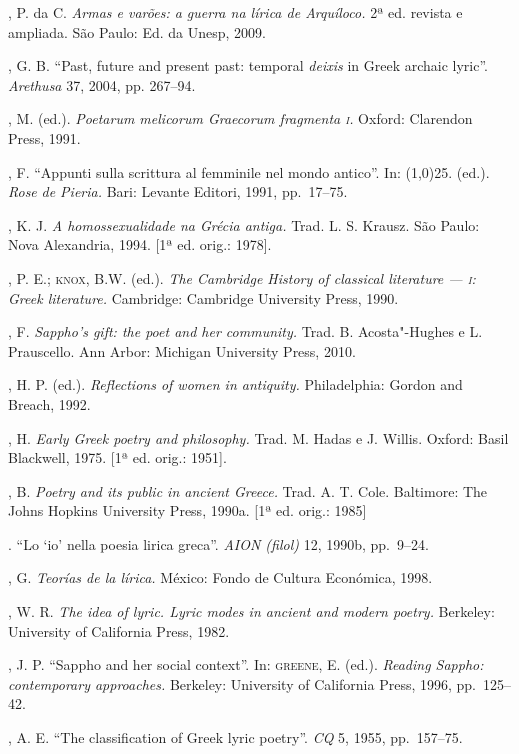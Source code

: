 \begin{bibliohedra}
, P. da C. \textit{Armas e varões: a guerra na
lírica de Arquíloco.} 2ª ed. revista e ampliada. São Paulo: Ed. da Unesp, 2009.

, G. B. “Past, future and present past: temporal
\textit{deixis} in Greek archaic lyric”. \textit{Arethusa} 37, 2004, pp.
267--94.

, M. (ed.). \textit{Poetarum melicorum Graecorum fragmenta \textsc{i}.}
Oxford: Clarendon Press, 1991.

, F. “Appunti sulla scrittura al femminile nel mondo antico''.
In: \line(1,0){25}. (ed.). \textit{Rose} \textit{de Pieria.} Bari: Levante Editori,
1991, pp.~17--75.

, K. J.  \textit{A homossexualidade na Grécia antiga.}
Trad. L. S. Krausz. São Paulo: Nova Alexandria, 1994. [1ª ed. orig.: 1978].

, P. E.; \textsc{knox}, B.W. (ed.). \textit{The Cambridge History of
classical literature --- \textsc{i}: Greek literature.} Cambridge: Cambridge University
Press, 1990.

, F. \textit{Sappho’s gift: the poet and her community.} Trad.
B. Acosta"-Hughes e L. Prauscello. Ann Arbor: Michigan University Press, 2010.

, H. P. (ed.). \textit{Reflections of women in antiquity.}
Philadelphia: Gordon and Breach, 1992.

, H. \textit{Early Greek poetry and philosophy.} Trad. M. Hadas
e J. Willis. Oxford: Basil Blackwell, 1975. [1ª ed. orig.: 1951]. 

, B. \textit{Poetry and its public in ancient Greece.} Trad. A.
T. Cole. Baltimore: The Johns Hopkins University Press, 1990a.
[1ª ed. orig.: 1985]

\titidem. “Lo ‘io’ nella poesia lirica greca”. \textit{AION (filol)} 12,
1990b, pp.~9--24.

, G. \textit{Teorías de la lírica.} México: Fondo de
Cultura Económica, 1998.

, W. R. \textit{The idea of lyric. Lyric modes in ancient and
modern poetry.} Berkeley: University of California Press, 1982.

, J. P. “Sappho and her social context”. In: \textsc{greene}, E.
(ed.). \textit{Reading Sappho: contemporary approaches.} Berkeley: University
of California Press, 1996, pp.~125--42.

, A. E. “The classification of Greek lyric poetry”. \textit{CQ}
5, 1955, pp.~157--75.


\end{bibliohedra}
